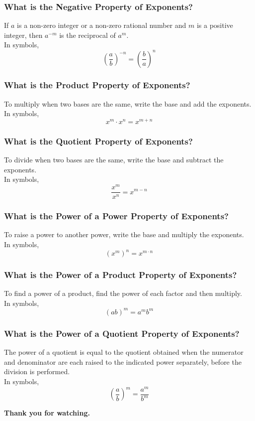 \documentclass[14pt]{beamer}
\begin{document}
    \begin{frame}
    	\frametitle{What is the Negative Property of Exponents?}
    	If $ a $ is a non-zero integer or a non-zero rational number and $ m $ is a positive integer, then $ a^{-m} $ is the reciprocal of $ a^m $. \\
    	In symbols, \[ \left(\frac{a}{b}\right)^{-n} = \left(\frac{b}{a}\right)^{n}  \]
    \end{frame}

    \begin{frame}
    	\frametitle{What is the Product Property of Exponents?}
    	To multiply when two bases are the same, write the base and add the exponents. \\
    	In symbols, \[ x^m \cdot x^n = x^{m + n} \]
    \end{frame}

    \begin{frame}
    	\frametitle{What is the Quotient Property of Exponents?}
    	To divide when two bases are the same, write the base and subtract the exponents. \\
    	In symbols, \[ \frac{x^m}{x^n} = x^{m - n} \]
    \end{frame}

    \begin{frame}
    	\frametitle{What is the Power of a Power Property of Exponents?}
    	 To raise a power to another power, write the base and multiply the exponents.\\
    	In symbols, \[ (x^m)^n = x^{m \cdot n} \]
    \end{frame}

    \begin{frame}
    	\frametitle{What is the Power of a Product Property of Exponents?}
    	To find a power of a product, find the power of each factor and then multiply. \\
    	In symbols, \[ (ab)^m = a^mb^m \]
    \end{frame}

    \begin{frame}
    	\frametitle{What is the Power of a Quotient Property of Exponents?}
    	The power of a quotient is equal to the quotient obtained when the numerator and denominator are each raised to the indicated power separately, before the division is performed.\\
    	In symbols, \[ \left(\frac{a}{b}\right)^m = \frac{a^m}{b^m} \]
    \end{frame}

    \begin{frame}
    	\begin{center}
    		\textbf{\LARGE Thank you for watching.}
    	\end{center}
    \end{frame}
	
\end{document}
